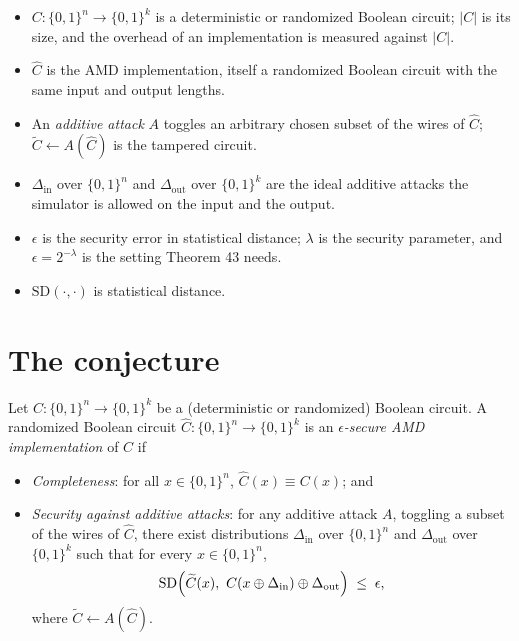 \documentclass{aicr-conjecture}
\newcommand{\bits}{\{0,1\}}
\newcommand{\eps}{\epsilon}
\newcommand{\SD}{\mathrm{SD}}
\begin{document}
\begin{itemize}[nosep]
  \item $C : \bits^{n} \to \bits^{k}$ is a deterministic or randomized
    Boolean circuit; $|C|$ is its size, and the overhead of an
    implementation is measured against $|C|$.
  \item $\widehat{C}$ is the AMD implementation, itself a randomized
    Boolean circuit with the same input and output lengths.
  \item An \emph{additive attack} $A$ toggles an arbitrary chosen subset
    of the wires of $\widehat{C}$; $\widetilde{C} \leftarrow
    A(\widehat{C})$ is the tampered circuit.
  \item $\Delta_{\mathrm{in}}$ over $\bits^{n}$ and
    $\Delta_{\mathrm{out}}$ over $\bits^{k}$ are the ideal additive
    attacks the simulator is allowed on the input and the output.
  \item $\eps$ is the security error in statistical distance;
    $\lambda$ is the security parameter, and $\eps = 2^{-\lambda}$ is
    the setting Theorem 43 needs.
  \item $\SD(\cdot,\cdot)$ is statistical distance.
\end{itemize}

\section{The conjecture}\label{sec:conjectures}

\begin{definition}\label{def:amd}
Let $C : \bits^{n} \to \bits^{k}$ be a (deterministic or randomized)
Boolean circuit. A randomized Boolean circuit $\widehat{C} : \bits^{n}
\to \bits^{k}$ is an \emph{$\eps$-secure AMD implementation} of $C$ if
\begin{itemize}[nosep]
  \item \emph{Completeness}: for all $x \in \bits^{n}$, $\widehat{C}(x)
    \equiv C(x)$; and
  \item \emph{Security against additive attacks}: for any additive
    attack $A$, toggling a subset of the wires of $\widehat{C}$, there
    exist distributions $\Delta_{\mathrm{in}}$ over $\bits^{n}$ and
    $\Delta_{\mathrm{out}}$ over $\bits^{k}$ such that for every $x \in
    \bits^{n}$,
    \[
      \SD\Bigl( \widetilde{C}(x),\ C(x \oplus \Delta_{\mathrm{in}})
      \oplus \Delta_{\mathrm{out}} \Bigr) \;\le\; \eps,
    \]
    where $\widetilde{C} \leftarrow A(\widehat{C})$.
\end{itemize}
\end{definition}
\end{document}
